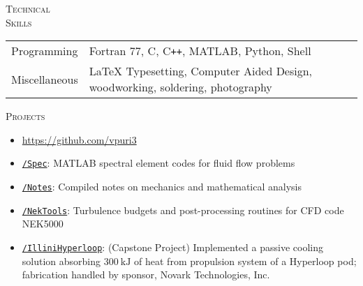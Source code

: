 \documentclass[10pt]{article}
\begin{document}
\vspace{-1.5em}
\begin{multicols}{2}
\textsc{\small Technical \\ Skills}
\columnbreak

\begin {table}[H]
\begin{tabular}{l l }
\hspace{-0.5em}Programming   & \hspace{-0.0em} Fortran 77, C, C\texttt{++}, MATLAB, Python, Shell\\
\hspace{-0.5em}Miscellaneous & \hspace{-0.0em} \LaTeX{} Typesetting, Computer Aided Design, woodworking, soldering, photography \\
\end{tabular}	
\end{table}

\vspace{-1.0em}
\end{multicols}
\vspace{-1.5em}
\begin{multicols}{2}
\textsc{\small Projects}
\columnbreak

\vspace{-1.75em}
\begin{itemize}[label=-]
    \setlength{\itemindent}{-1.75em}
    \setlength\itemsep{-0.25em}
    \item[]\hspace{-1.0em} \url{https://github.com/vpuri3}
    \item \href{https://github.com/vpuri3/Spec}{\texttt{/Spec}}: MATLAB spectral element codes for fluid flow problems
    \item \href{https://github.com/vpuri3/Notes}{\texttt{/Notes}}: Compiled notes on mechanics and mathematical analysis
    \item \href{https://github.com/vpuri3/NekTools}{\texttt{/NekTools}}: Turbulence budgets and post-processing routines for CFD code NEK5000
    \item \href{https://github.com/vpuri3/IlliniHyperloop}{\texttt{/IlliniHyperloop}}: (Capstone Project) Implemented a passive cooling solution absorbing $\SI{300}{\kilo \joule}$ of heat from propulsion system of a Hyperloop pod; fabrication handled by sponsor, Novark Technologies, Inc.
\end{itemize}
\vspace{-2.0em}

\end{multicols}
\vspace{-1.5em}
\vfill
\end{document}
